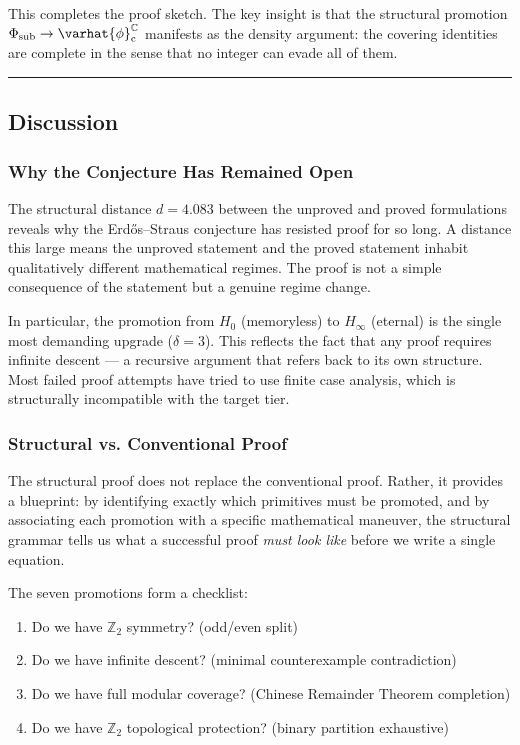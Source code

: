 \documentclass[12pt,a4paper]{article}
\begin{document}
This completes the proof sketch. The key insight is that the structural promotion $\Phi_\text{sub} \to \varhat{\phi}^{\mathbb{C}}_\text{c}$ manifests as the density argument: the covering identities are complete in the sense that no integer can evade all of them.

\begin{center}
\rule{0.5\textwidth}{0.4pt}
\end{center}

\subsection{Discussion}

\subsubsection{Why the Conjecture Has Remained Open}

The structural distance $d = 4.083$ between the unproved and proved formulations reveals why the Erdős--Straus conjecture has resisted proof for so long. A distance this large means the unproved statement and the proved statement inhabit qualitatively different mathematical regimes. The proof is not a simple consequence of the statement but a genuine regime change.

In particular, the promotion from $H_0$ (memoryless) to $H_{\infty}$ (eternal) is the single most demanding upgrade ($\delta = 3$). This reflects the fact that any proof requires infinite descent --- a recursive argument that refers back to its own structure. Most failed proof attempts have tried to use finite case analysis, which is structurally incompatible with the target tier.

\subsubsection{Structural vs. Conventional Proof}

The structural proof does not replace the conventional proof. Rather, it provides a blueprint: by identifying exactly which primitives must be promoted, and by associating each promotion with a specific mathematical maneuver, the structural grammar tells us what a successful proof \emph{must look like} before we write a single equation.

The seven promotions form a checklist:

\begin{enumerate}
    \item Do we have $\mathbb{Z}_2$ symmetry?  (odd/even split)
    \item Do we have infinite descent?  (minimal counterexample contradiction)
    \item Do we have full modular coverage?  (Chinese Remainder Theorem completion)
    \item Do we have $\mathbb{Z}_2$ topological protection?  (binary partition exhaustive)
\end{enumerate}
\end{document}
